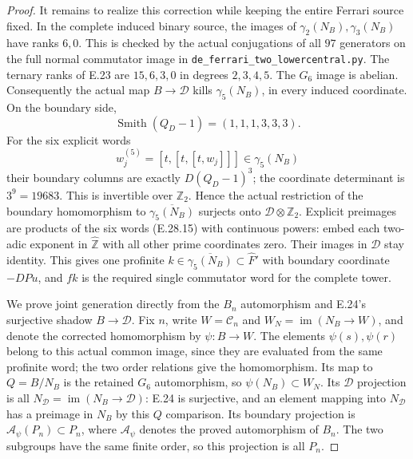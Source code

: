\begin{proof}
It remains to realize this correction while keeping the
entire Ferrari source fixed.  In the complete induced
binary source, the images of
$\gamma_2(N_B),\gamma_3(N_B)$ have ranks $6,0$.
This is checked by the actual conjugations of all $97$
generators on the full normal commutator image in
\texttt{de\_ferrari\_two\_lowercentral.py}.
The ternary ranks of E.23 are $15,6,3,0$ in degrees
$2,3,4,5$.  The $G_6$ image is abelian.
Consequently the actual map $B\to\mathscr D$ kills
$\gamma_5(N_B)$, in every induced coordinate.
On the boundary side,
\[
 \operatorname{Smith}(Q_D-1)=(1,1,1,3,3,3).
 \tag{E.28.14}
\]
For the six explicit words
\[
       w_j^{(5)}=[t,[t,[t,w_j]]]\in\gamma_5(N_B)
 \tag{E.28.15}
\]
their boundary columns are exactly $D(Q_D-1)^3$; the
coordinate determinant is $3^9=19683$.
This is invertible over $\mathbb Z_2$.
Hence the actual restriction of the boundary homomorphism
to $\overline{\gamma_5(N_B)}$ surjects onto
$\mathcal D\otimes\mathbb Z_2$.
Explicit preimages are products of the six words
(E.28.15) with continuous powers: embed each two-adic
exponent in $\widehat{\mathbb Z}$ with all other prime
coordinates zero.  Their images in $\mathscr D$ stay
identity.  This gives one profinite $k\in
\overline{\gamma_5(N_B)}\subset\widehat F'$ with boundary
coordinate $-DPu$, and $fk$ is the required single
commutator word for the complete tower.

We prove joint generation directly from the $B_n$
automorphism and E.24's surjective shadow
$B\to\mathscr D$.  Fix $n$, write
$W=\mathscr C_n$ and $W_N=\operatorname{im}(N_B\to W)$,
and denote the corrected homomorphism by $\psi:B\to W$.
The elements $\psi(s),\psi(r)$ belong to this actual common
image, since they are evaluated from the same profinite
word; the two order relations give the homomorphism.
Its map to $Q=B/N_B$ is the retained $G_6$ automorphism,
so $\psi(N_B)\subset W_N$.  Its $\mathscr D$ projection
is all $N_{\mathscr D}=\operatorname{im}(N_B\to\mathscr D)$:
E.24 is surjective, and an element mapping into
$N_{\mathscr D}$ has a preimage in $N_B$ by this
$Q$ comparison.  Its boundary projection is
$\mathcal A_\psi(P_n)\subset P_n$, where
$\mathcal A_\psi$ denotes the proved automorphism of $B_n$.
The two subgroups have the same finite order, so this
projection is all $P_n$.


\end{proof}
